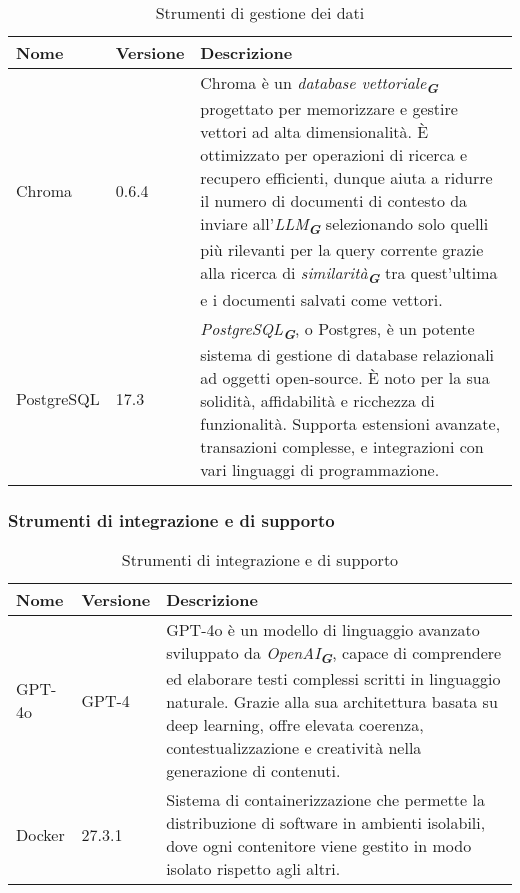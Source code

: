 \begin{table}[h!]
    \centering
    \renewcommand{\arraystretch}{1.6} %
    \begin{tabularx}{\textwidth}{|p{2cm}|p{2cm}|X|} \hline
    \rowcolor[HTML]{FFD700} 
    \textbf{Nome} & \textbf{Versione} & \textbf{Descrizione} \\ 
    \hline
    Chroma & 0.6.4 & Chroma è un \emph{database vettoriale}\textsubscript{\textbf{\textit{G}}} progettato per memorizzare e
                    gestire vettori ad alta dimensionalità. 
                    È ottimizzato per operazioni di ricerca e recupero efficienti, dunque aiuta a ridurre il numero di documenti
                    di contesto da inviare all'\emph{LLM}\textsubscript{\textbf{\textit{G}}} selezionando solo quelli più rilevanti
                    per la query corrente grazie alla ricerca di \emph{similarità}\textsubscript{\textbf{\textit{G}}} tra 
                    quest'ultima e i documenti salvati come vettori. \\ \hline
    PostgreSQL & 17.3 & \emph{PostgreSQL}\textsubscript{\textbf{\textit{G}}}, o Postgres, è un potente sistema di gestione di
    database relazionali ad oggetti open-source. 
    È noto per la sua solidità, affidabilità e ricchezza di funzionalità. Supporta estensioni avanzate, transazioni complesse, e 
    integrazioni con vari linguaggi di programmazione. \\ \hline
    \end{tabularx}
    \caption{Strumenti di gestione dei dati}
\end{table}


\subsubsection{Strumenti di integrazione e di supporto}
\label{subsec:strumenti_integrazione_supporto}

\begin{table}[h!]
    \centering
    \renewcommand{\arraystretch}{1.6} %
    \begin{tabularx}{\textwidth}{|p{2cm}|p{2cm}|X|} \hline
    \rowcolor[HTML]{FFD700} 
    \textbf{Nome} & \textbf{Versione} & \textbf{Descrizione} \\ 
    \hline
    GPT-4o & GPT-4 & GPT-4o è un modello di linguaggio avanzato sviluppato da \emph{OpenAI}\textsubscript{\textbf{\textit{G}}},
    capace di comprendere ed elaborare testi complessi scritti in linguaggio naturale. 
    Grazie alla sua architettura basata su deep learning, offre elevata coerenza, contestualizzazione e creatività nella generazione
    di contenuti. \\ \hline
    Docker & 27.3.1 & Sistema di containerizzazione che permette la distribuzione
    di software in ambienti isolabili, dove ogni contenitore
    viene gestito in modo isolato rispetto agli altri. \\ \hline
    \end{tabularx}
    \caption{Strumenti di integrazione e di supporto}
\end{table}

